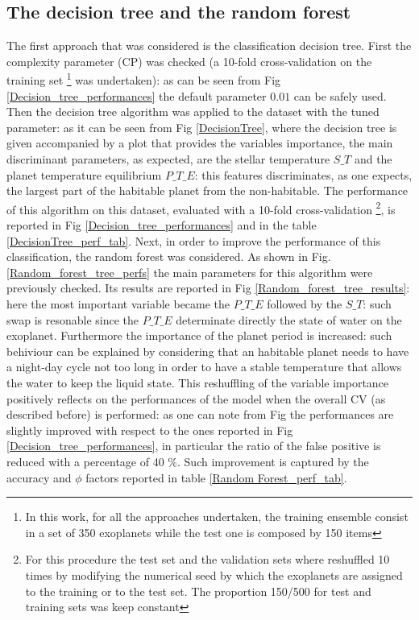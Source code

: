 \documentclass[
12pt, %
a4paper, %
oneside, %
headinclude,footinclude, %
BCOR5mm, %
]{scrartcl}
\begin{document}
\subsection{The decision tree and the random forest}
The first approach that was considered is the classification decision tree. First the complexity parameter (CP) was checked (a 10-fold cross-validation on the training set \footnote{In this work, for all the approaches undertaken, the training ensemble consist in a set of 350 exoplanets while the test one is composed by 150 items} was undertaken): as can be seen from Fig \ref{Decision_tree_performances} the default parameter $0.01$ can be safely used. Then the decision tree algorithm was applied to the dataset with the tuned parameter: as it can be seen from Fig \ref{DecisionTree}, where the decision tree is given accompanied by a plot that provides the variables importance,  the main discriminant parameters, as expected, are the stellar temperature $S\_T$ and the planet temperature equilibrium $P\_T\_E$: this features discriminates, as one expects, the largest part of the habitable planet from the non-habitable. The performance of this algorithm on this dataset, evaluated with a 10-fold cross-validation \footnote{For this procedure the test set and the validation sets where reshuffled 10 times by modifying the numerical seed by which the exoplanets are assigned to the training or to the test set. The proportion 150/500 for test and training sets was keep constant}, is reported in Fig \ref{Decision_tree_performances} and in the table \ref{DecisionTree_perf_tab}. Next, in order to improve the performance of this classification, the random forest was considered. As shown in Fig. \ref{Random_forest_tree_perfs} the main parameters for this algorithm were previously checked. Its results are reported in Fig \ref{Random_forest_tree_results}: here the most important variable became the $P\_T\_E$ followed by the $S\_T$: such swap is resonable since the $P\_T\_E$ determinate directly the state of water on the exoplanet. Furthermore the importance of the planet period is increased: such behiviour can be explained by considering that an habitable planet needs  to have a night-day cycle not too long in order to have a stable temperature that allows the water to keep the liquid state.  This reshuffling of the variable importance positively reflects on the performances of the model when the overall CV (as described before) is performed: as one can note from Fig the performances are slightly improved with respect to the ones reported in Fig \ref{Decision_tree_performances}, in particular the ratio of the false positive is reduced with a percentage of 40 $\%$. Such improvement is captured by the accuracy and $\phi$ factors reported in table \ref{Random Forest_perf_tab}. 
\end{document}
